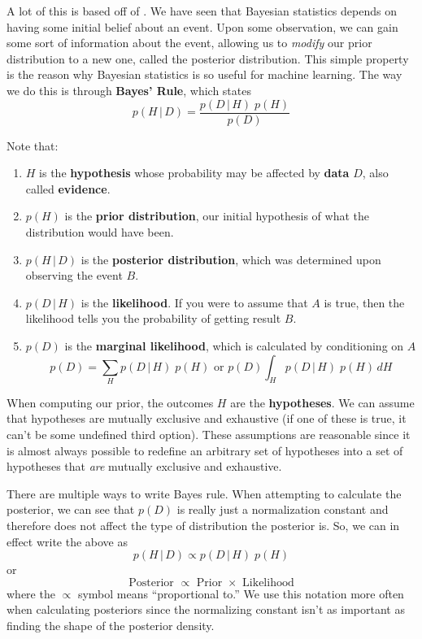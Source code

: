 A lot of this is based off of \cite{2009hoff}. We have seen that Bayesian statistics depends on having some initial belief about an event. Upon some observation, we can gain some sort of information about the event, allowing us to \textit{modify} our prior distribution to a new one, called the posterior distribution. This simple property is the reason why Bayesian statistics is so useful for machine learning. The way we do this is through \textbf{Bayes' Rule}, which states
\begin{equation}
  p(H\,|\,D) = \frac{p(D\,|\,H) \; p(H)}{p(D)}
\end{equation}

Note that:
\begin{enumerate}
  \item $H$ is the \textbf{hypothesis} whose probability may be affected by \textbf{data} $D$, also called \textbf{evidence}.
  \item $p(H)$ is the \textbf{prior distribution}, our initial hypothesis of what the distribution would have been.
  \item $p(H\,|\,D)$ is the \textbf{posterior distribution}, which was determined upon observing the event $B$.
  \item $p(D\,|\,H)$ is the \textbf{likelihood}. If you were to assume that $A$ is true, then the likelihood tells you the probability of getting result $B$.
  \item $p(D)$ is the \textbf{marginal likelihood}, which is calculated by conditioning on $A$
  \begin{equation}
    p(D) = \sum_H p(D\,|\,H)\; p(H) \text{ or } p(D) \int_H p(D\,|\,H)\; p(H) \, dH
  \end{equation}
\end{enumerate}

When computing our prior, the outcomes $H$ are the \textbf{hypotheses}. We can assume that hypotheses are mutually exclusive and exhaustive (if one of these is true, it can't be some undefined third option). These assumptions are reasonable since it is almost always possible to redefine an arbitrary set of hypotheses into a set of hypotheses that \textit{are} mutually exclusive and exhaustive.

There are multiple ways to write Bayes rule. When attempting to calculate the posterior, we can see that $p(D)$ is really just a normalization constant and therefore does not affect the type of distribution the posterior is. So, we can in effect write the above as
\begin{equation}
  p(H\,|\,D) \propto p(D\,|\,H)\; p(H)
\end{equation}
or
\begin{equation}
  \text{Posterior } \propto \text{ Prior } \times \text{ Likelihood}
\end{equation}
where the $\propto$ symbol means ``proportional to.'' We use this notation more often when calculating posteriors since the normalizing constant isn't as important as finding the shape of the posterior density.

